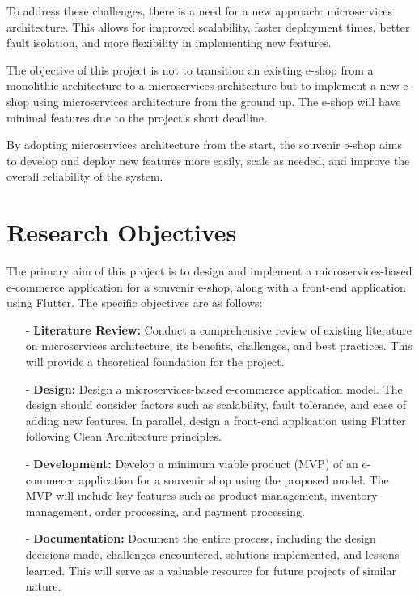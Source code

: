 To address these challenges, there is a need for a new approach: microservices architecture. This allows for improved scalability, faster deployment times, better fault isolation, and more flexibility in implementing new features.

The objective of this project is not to transition an existing e-shop from a monolithic architecture to a microservices architecture but to implement a new e-shop using microservices architecture from the ground up. The e-shop will have minimal features due to the project’s short deadline.

By adopting microservices architecture from the start, the souvenir e-shop aims to develop and deploy new features more easily, scale as needed, and improve the overall reliability of the system.

\section{Research Objectives}
The primary aim of this project is to design and implement a microservices-based e-commerce application for a souvenir e-shop, along with a front-end application using Flutter. The specific objectives are as follows:
\begin{itemize}
    \item[-] \textbf{Literature Review:} Conduct a comprehensive review of existing literature on microservices architecture, its benefits, challenges, and best practices. This will provide a theoretical foundation for the project.
    \item[-] \textbf{Design:} Design a microservices-based e-commerce application model. The design should consider factors such as scalability, fault tolerance, and ease of adding new features. In parallel, design a front-end application using Flutter following Clean Architecture principles.
    \item[-] \textbf{Development:} Develop a minimum viable product (MVP) of an e-commerce application for a souvenir shop using the proposed model. The MVP will include key features such as product management, inventory management, order processing, and payment processing.
    \item[-] \textbf{Documentation:} Document the entire process, including the design decisions made, challenges encountered, solutions implemented, and lessons learned. This will serve as a valuable resource for future projects of similar nature.
\end{itemize}
